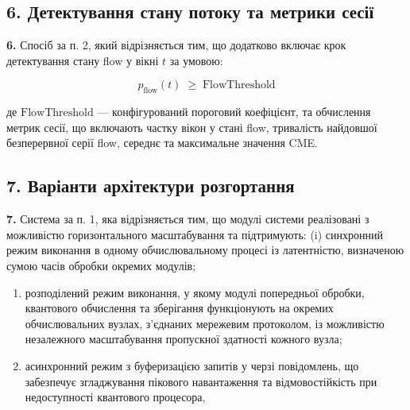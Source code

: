 \documentclass[12pt,a4paper]{article}
\begin{document}
\subsection{6. Детектування стану потоку та метрики сесії}\label{ux434ux435ux442ux435ux43aux442ux443ux432ux430ux43dux43dux44f-ux441ux442ux430ux43dux443-ux43fux43eux442ux43eux43aux443-ux442ux430-ux43cux435ux442ux440ux438ux43aux438-ux441ux435ux441ux456ux457}



\textbf{6.} Спосіб за п. 2, який відрізняється тим, що додатково включає крок детектування стану flow у вікні \(t\) за умовою:



\[p_{\text{flow}}(t) \;\geq\; \text{FlowThreshold}\]



де \(\text{FlowThreshold}\) --- конфігурований пороговий коефіцієнт, та обчислення метрик сесії, що включають частку вікон у стані flow, тривалість найдовшої безперервної серії flow, середнє та максимальне значення CME.



\subsection{7. Варіанти архітектури розгортання}\label{ux432ux430ux440ux456ux430ux43dux442ux438-ux430ux440ux445ux456ux442ux435ux43aux442ux443ux440ux438-ux440ux43eux437ux433ux43eux440ux442ux430ux43dux43dux44f}



\textbf{7.} Система за п. 1, яка відрізняється тим, що модулі системи реалізовані з можливістю горизонтального масштабування та підтримують: (i) синхронний режим виконання в одному обчислювальному процесі із латентністю, визначеною сумою часів обробки окремих модулів;



\begin{enumerate}

\def\labelenumi{(\roman{enumi})}

\setcounter{enumi}{1}

\item

  розподілений режим виконання, у якому модулі попередньої обробки, квантового обчислення та зберігання функціонують на окремих обчислювальних вузлах, з'єднаних мережевим протоколом, із можливістю незалежного масштабування пропускної здатності кожного вузла;

\item

  асинхронний режим з буферизацією запитів у черзі повідомлень, що забезпечує згладжування пікового навантаження та відмовостійкість при недоступності квантового процесора,

\end{enumerate}
\end{document}
